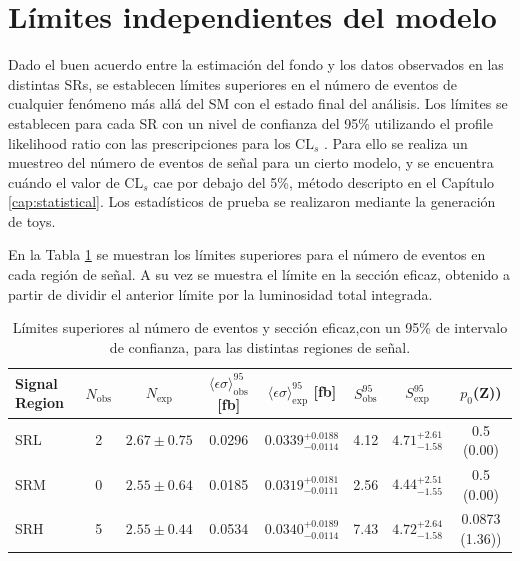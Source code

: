 \section{Límites independientes del modelo}

Dado el buen acuerdo entre la estimación del fondo y los datos observados en las distintas SRs, se establecen límites superiores en el número de eventos de cualquier fenómeno más allá del SM con el estado final del análisis. Los límites se establecen para cada SR con un nivel de confianza del 95\% utilizando el profile likelihood ratio con las prescripciones para los $\text{CL}_{s}$ \cite{Read:2002hq}. Para ello se realiza un muestreo del número de eventos de señal para un cierto modelo, y se encuentra cuándo el valor de $\text{CL}_{s}$ cae por debajo del 5\%, método descripto en el Capítulo \ref{cap:statistical}. Los estadísticos de prueba se realizaron mediante la generación de  toys.

En la Tabla \ref{tab:model_indep_ul} se muestran los límites superiores para el número de eventos en cada región de señal. A su vez se muestra el límite en la sección eficaz, obtenido a partir de dividir el anterior límite por la luminosidad total integrada. 


\begin{table}[!h]
  \centering
  \caption{Límites superiores al número de eventos y sección eficaz,con un 95\% de intervalo de confianza, para las distintas regiones de señal. }

  \begin{tabular}{l|c|c|ccccc}
    \hline
    \hline
    Signal Region & $N_{\mathrm{obs}}$  & $N_{\mathrm{exp}}$  & $\langle\epsilon{\sigma}\rangle_{\mathrm{obs}}^{95}$ [fb]  & $\langle\epsilon{\sigma}\rangle_{\mathrm{exp}}^{95}$ [fb] & $S_{\mathrm{obs}}^{95}$  & $S_{\mathrm{exp}}^{95}$ & $p_{0}$(Z))\\
    \hline
    SRL           & 2                   & $2.67 \pm 0.75$     &               0.0296                                       &         $0.0339^{+0.0188}_{-0.0114}$               &                       4.12  &  $4.71^{+2.61}_{-1.58}$ &  0.5 (0.00) \\
    SRM           & 0                   & $2.55 \pm 0.64$     &               0.0185                                       &         $0.0319^{+0.0181}_{-0.0111}$               &                       2.56  &  $4.44^{+2.51}_{-1.55}$ &  0.5 (0.00) \\
    SRH           & 5                   & $2.55 \pm 0.44$     &               0.0534                                       &         $0.0340^{+0.0189}_{-0.0114}$               &                       7.43  &  $4.72^{+2.64}_{-1.58}$ & 0.0873 (1.36)) \\
    \hline
    \hline
  \end{tabular}
  \label{tab:model_indep_ul}
\end{table}


